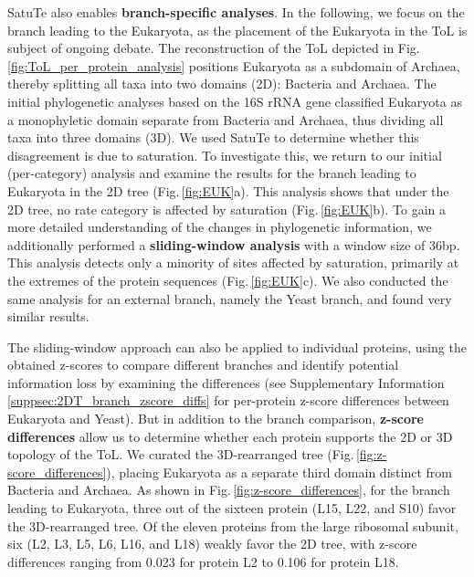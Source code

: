 \medskip 

SatuTe also enables \textbf{branch-specific analyses}. In the following, we focus on the branch leading to the Eukaryota, as the placement of the Eukaryota in the ToL is subject of ongoing debate. The reconstruction of the ToL depicted in Fig.\,\ref{fig:ToL_per_protein_analysis} positions Eukaryota as a subdomain of Archaea, thereby splitting all taxa into two domains (2D): Bacteria and Archaea. The initial phylogenetic analyses based on the 16S rRNA gene  classified Eukaryota as a monophyletic domain separate from Bacteria and Archaea, thus dividing all taxa into three domains (3D). We used SatuTe to determine whether this disagreement is due to saturation. To investigate this, we return to our initial (per-category) analysis and examine the results for the branch leading to Eukaryota in the 2D tree (Fig.\,\ref{fig:EUK}a). This analysis shows that under the 2D tree, no rate category is affected by saturation (Fig.\,\ref{fig:EUK}b). To gain a more detailed understanding of the changes in phylogenetic information, we additionally performed a \textbf{sliding-window analysis} with a window size of $36$bp. This analysis detects only a minority of sites affected by saturation, primarily at the extremes of the protein sequences (Fig.\,\ref{fig:EUK}c). We  also conducted the same analysis for an external branch, namely the Yeast branch, and found very similar results.

\medskip

The sliding-window approach can also be applied to individual proteins, using the obtained z-scores to compare different branches and identify potential information loss by examining the differences (see Supplementary Information\,\ref{suppsec:2DT_branch_zscore_diffs} for per-protein z-score differences between Eukaryota and Yeast). %
But in addition to the branch comparison, \textbf{z-score differences} allow us to determine whether each protein supports the 2D or 3D topology of the ToL. We curated the 3D-rearranged tree (Fig.\,\ref{fig:z-score_differences}), placing Eukaryota as a separate third domain distinct from Bacteria and Archaea. As shown in Fig.\,\ref{fig:z-score_differences}, for the branch leading to Eukaryota,  three out of the sixteen protein (L15, L22, and S10) favor the 3D-rearranged tree. Of the eleven proteins from the large ribosomal subunit, six (L2, L3, L5, L6, L16, and L18) weakly favor the 2D tree, with z-score differences ranging from 0.023 for protein L2 to 0.106 for protein L18.

